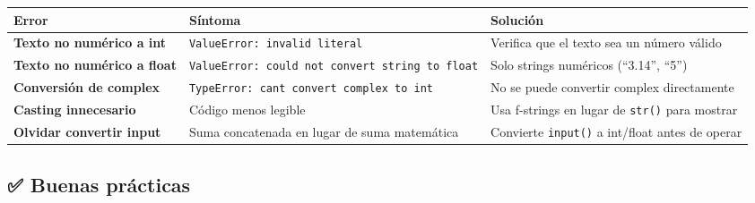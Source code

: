 \documentclass[
  doc,
  floatsintext,
  longtable,
  a4paper,
  nolmodern,
  notxfonts,
  notimes,
  12pt,
  colorlinks=true,linkcolor=blue,citecolor=blue,urlcolor=blue]{apa7}
\newcounter{none} %
\begin{document}
{\def\LTcaptype{none} %
\begin{longtable}[]{@{}
  >{\raggedright\arraybackslash}p{}
  >{\raggedright\arraybackslash}p{}
  >{\raggedright\arraybackslash}p{}@{}}
\toprule\noalign{}
\begin{minipage}[b]{\linewidth}\raggedright
Error
\end{minipage} & \begin{minipage}[b]{\linewidth}\raggedright
Síntoma
\end{minipage} & \begin{minipage}[b]{\linewidth}\raggedright
Solución
\end{minipage} \\
\midrule\noalign{}
\endhead
\bottomrule\noalign{}
\endlastfoot
\textbf{Texto no numérico a int} &
\texttt{ValueError:\ invalid\ literal} & Verifica que el texto sea un
número válido \\
\textbf{Texto no numérico a float} &
\texttt{ValueError:\ could\ not\ convert\ string\ to\ float} & Solo
strings numéricos (``3.14'', ``5'') \\
\textbf{Conversión de complex} &
\texttt{TypeError:\ can\textquotesingle{}t\ convert\ complex\ to\ int} &
No se puede convertir complex directamente \\
\textbf{Casting innecesario} & Código menos legible & Usa f-strings en
lugar de \texttt{str()} para mostrar \\
\textbf{Olvidar convertir input} & Suma concatenada en lugar de suma
matemática & Convierte \texttt{input()} a int/float antes de operar \\
\end{longtable}
}

\subsection{✅ Buenas prácticas}\label{buenas-pruxe1cticas}
\end{document}
